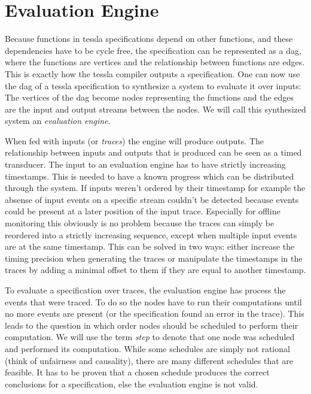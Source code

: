 
\section{ Evaluation Engine}
\label{sec:definitions:eval_engine}

Because functions in \gls{tessla} specifications depend on other functions, and these dependencies have to be cycle free, the specification can be represented as a \gls{dag}, where the functions are vertices and the relationship between functions are edges.
This is exactly how the \gls{tessla} compiler outputs a specification.
One can now use the \gls{dag} of a \gls{tessla} specification to synthesize a system to evaluate it over inputs:
The vertices of the \gls{dag} become nodes representing the functions and the edges are the input and output streams between the nodes.
We will call this synthesized system an \emph{evaluation engine}.

When fed with inputs (or \emph{traces}) the engine will produce outputs.
The relationship between inputs and outputs that is produced can be seen as a timed transducer.
The input to an evaluation engine has to have strictly increasing timestamps.
This is needed to have a known progress which can be distributed through the system.
If inputs weren't ordered by their timestamp for example the absense of input events on a specific stream couldn't be detected because events could be present at a later position of the input trace.
Especially for offline monitoring this obviously is no problem because the traces can simply be reordered into a strictly increasing sequence, except when multiple input events are at the same timestamp.
This can be solved in two ways: either increase the timing precision when generating the traces or manipulate the timestamps in the traces by adding a minimal offset to them if they are equal to another timestamp.

To evaluate a specification over traces, the evaluation engine has process the events that were traced.
To do so the nodes have to run their computations until no more events are present (or the specification found an error in the trace).
This leads to the question in which order nodes should be scheduled to perform their computation.
We will use the term \emph{step} to denote that one node was scheduled and performed its computation.
While some schedules are simply not rational (think of unfairness and causality), there are many different schedules that are feasible.
It has to be proven that a chosen schedule produces the correct conclusions for a specification, else the evaluation engine is not valid.

